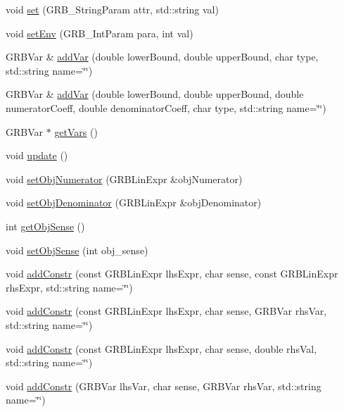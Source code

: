 \begin{DoxyCompactItemize}
\item 
void \hyperlink{classgrbfrc_1_1FMILP_a74b9551933ba80e72ed59adf4c0a4973}{set} (G\+R\+B\+\_\+\+String\+Param attr, std\+::string val)
\item 
void \hyperlink{classgrbfrc_1_1FMILP_ac19e80d0b147c51d390897ce5012ba4c}{set\+Env} (G\+R\+B\+\_\+\+Int\+Param para, int val)
\item 
G\+R\+B\+Var \& \hyperlink{classgrbfrc_1_1FMILP_ab646c83b90d8693d82c0725b59b32e7e}{add\+Var} (double lower\+Bound, double upper\+Bound, char type, std\+::string name=\char`\"{}\char`\"{})
\item 
G\+R\+B\+Var \& \hyperlink{classgrbfrc_1_1FMILP_a50b35d6917057f852051449d3efb2e4e}{add\+Var} (double lower\+Bound, double upper\+Bound, double numerator\+Coeff, double denominator\+Coeff, char type, std\+::string name=\char`\"{}\char`\"{})
\item 
G\+R\+B\+Var $\ast$ \hyperlink{classgrbfrc_1_1FMILP_a82e2e741d1b528dee6b89e2e78ea792a}{get\+Vars} ()
\item 
void \hyperlink{classgrbfrc_1_1FMILP_ace026c6b2263f7f223eb7fd913f2e269}{update} ()
\item 
void \hyperlink{classgrbfrc_1_1FMILP_a91eaec761ac1e1d07018d3cb5512bfee}{set\+Obj\+Numerator} (G\+R\+B\+Lin\+Expr \&obj\+Numerator)
\item 
void \hyperlink{classgrbfrc_1_1FMILP_a493bb568964e5b860c76c4f4be5e41e3}{set\+Obj\+Denominator} (G\+R\+B\+Lin\+Expr \&obj\+Denominator)
\item 
int \hyperlink{classgrbfrc_1_1FMILP_a6c8ce619a50d2204113d6b16e9cc39a8}{get\+Obj\+Sense} ()
\item 
void \hyperlink{classgrbfrc_1_1FMILP_ae6b816f8e2da2e685a7ace8377605622}{set\+Obj\+Sense} (int obj\+\_\+sense)
\item 
void \hyperlink{classgrbfrc_1_1FMILP_ae8b0c42c0a3c149c963460589df36712}{add\+Constr} (const G\+R\+B\+Lin\+Expr lhs\+Expr, char sense, const G\+R\+B\+Lin\+Expr rhs\+Expr, std\+::string name=\char`\"{}\char`\"{})
\item 
void \hyperlink{classgrbfrc_1_1FMILP_a699e5047bda4129fe20bf3163319d4b2}{add\+Constr} (const G\+R\+B\+Lin\+Expr lhs\+Expr, char sense, G\+R\+B\+Var rhs\+Var, std\+::string name=\char`\"{}\char`\"{})
\item 
void \hyperlink{classgrbfrc_1_1FMILP_aec485b0df699b5b947a7f6fc42861aa0}{add\+Constr} (const G\+R\+B\+Lin\+Expr lhs\+Expr, char sense, double rhs\+Val, std\+::string name=\char`\"{}\char`\"{})
\item 
void \hyperlink{classgrbfrc_1_1FMILP_a6ab655cc18db6b78d22a2d5da31e0145}{add\+Constr} (G\+R\+B\+Var lhs\+Var, char sense, G\+R\+B\+Var rhs\+Var, std\+::string name=\char`\"{}\char`\"{})

\end{DoxyCompactItemize}
